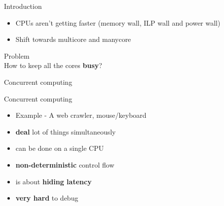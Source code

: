 \else
\begin{frame}{Introduction}
\begin{itemize}
\item \small CPUs aren't getting faster (memory wall, ILP wall and power wall)
\item \small Shift towards multicore and manycore
\end{itemize}
\begin{center}
\Large {\color{red} Problem}\\
How to keep all the cores \textbf{busy}?
\end{center}
\pause
\begin{center}
Concurrent computing
\end{center}
\end{frame}

\begin{frame}{Concurrent computing}
\begin{itemize}
\item Example - A web crawler, mouse/keyboard
\item \textbf{deal} lot of things simultaneously
\item can be done on a single CPU
\item \textbf{non-deterministic} control flow
\item is about \textbf{hiding latency}
\item \textbf{very hard} to debug
\end{itemize}
\end{frame}
\fi